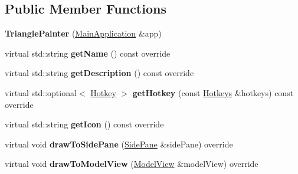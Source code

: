 \subsection*{Public Member Functions}
\begin{DoxyCompactItemize}
\item 
\mbox{\label{classpepr3d_1_1_triangle_painter_a960c0d36b0d8bd8eb9b1f18876894b7b}} 
{\bfseries Triangle\+Painter} (\mbox{\hyperlink{classpepr3d_1_1_main_application}{Main\+Application}} \&app)
\item 
\mbox{\label{classpepr3d_1_1_triangle_painter_a4064f4e3d370d72b13c16f8ed08207f2}} 
virtual std\+::string {\bfseries get\+Name} () const override
\item 
\mbox{\label{classpepr3d_1_1_triangle_painter_aeed99d15de0444336f86520bd1b6a360}} 
virtual std\+::string {\bfseries get\+Description} () const override
\item 
\mbox{\label{classpepr3d_1_1_triangle_painter_ad5d98e4a492606bd59c36cc2b319d0fb}} 
virtual std\+::optional$<$ \mbox{\hyperlink{structpepr3d_1_1_hotkey}{Hotkey}} $>$ {\bfseries get\+Hotkey} (const \mbox{\hyperlink{classpepr3d_1_1_hotkeys}{Hotkeys}} \&hotkeys) const override
\item 
\mbox{\label{classpepr3d_1_1_triangle_painter_a4c63bae3ec3f2d909ea4f4ae1fa61d33}} 
virtual std\+::string {\bfseries get\+Icon} () const override
\item 
\mbox{\label{classpepr3d_1_1_triangle_painter_a75abd7d20eaf815b3f17973e78300953}} 
virtual void {\bfseries draw\+To\+Side\+Pane} (\mbox{\hyperlink{classpepr3d_1_1_side_pane}{Side\+Pane}} \&side\+Pane) override
\item 
\mbox{\label{classpepr3d_1_1_triangle_painter_a2a2a26bd5c33bc504014f9fcf9dbcae6}} 
virtual void {\bfseries draw\+To\+Model\+View} (\mbox{\hyperlink{classpepr3d_1_1_model_view}{Model\+View}} \&model\+View) override
\item 
\mbox{\label{classpepr3d_1_1_triangle_painter_ada0494fd30bbdbf789cb4fa5ac980a9d}} 

\end{DoxyCompactItemize}
